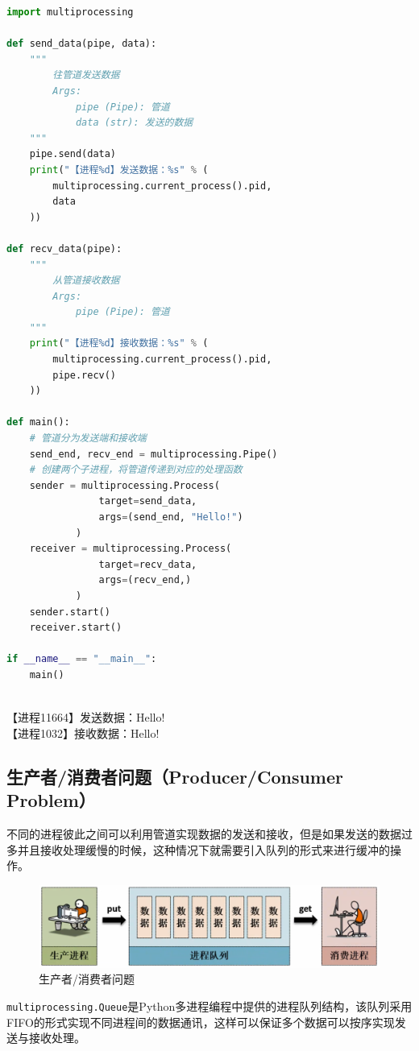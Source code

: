 \begin{lstlisting}[language=Python, title=创建进程通讯管道]
import multiprocessing

def send_data(pipe, data):
	"""
		往管道发送数据
		Args:
			pipe (Pipe): 管道
			data (str): 发送的数据
	"""
	pipe.send(data)
	print("【进程%d】发送数据：%s" % (
		multiprocessing.current_process().pid,
		data
	))

def recv_data(pipe):
	"""
		从管道接收数据
		Args:
			pipe (Pipe): 管道
	"""
	print("【进程%d】接收数据：%s" % (
		multiprocessing.current_process().pid, 
		pipe.recv()
	))

def main():
	# 管道分为发送端和接收端
	send_end, recv_end = multiprocessing.Pipe()
	# 创建两个子进程，将管道传递到对应的处理函数
	sender = multiprocessing.Process(
				target=send_data,
				args=(send_end, "Hello!")
			)
	receiver = multiprocessing.Process(
				target=recv_data,
				args=(recv_end,)
			)
	sender.start()
	receiver.start()

if __name__ == "__main__":
	main()
\end{lstlisting}

\begin{tcolorbox}
	 \\
	【进程11664】发送数据：Hello! \\
	【进程1032】接收数据：Hello!
\end{tcolorbox}

\subsection{生产者/消费者问题（Producer/Consumer Problem）}

不同的进程彼此之间可以利用管道实现数据的发送和接收，但是如果发送的数据过多并且接收处理缓慢的时候，这种情况下就需要引入队列的形式来进行缓冲的操作。

\begin{figure}[H]
	\centering
	\includegraphics[scale=0.6]{img/C2/2-5/2.png}
	\caption{生产者/消费者问题}
\end{figure}

\lstinline|multiprocessing.Queue|是Python多进程编程中提供的进程队列结构，该队列采用FIFO的形式实现不同进程间的数据通讯，这样可以保证多个数据可以按序实现发送与接收处理。

